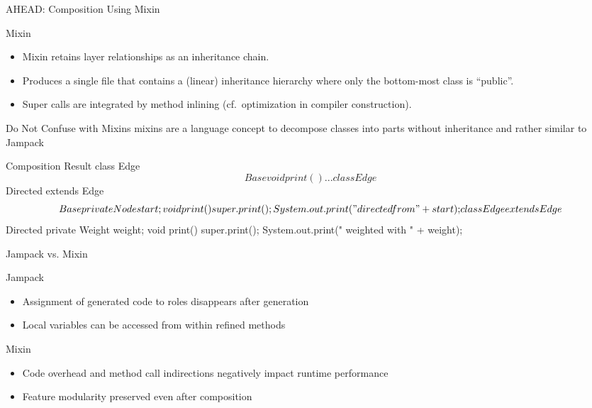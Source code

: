 \begin{frame}[fragile]{AHEAD: Composition Using Mixin}
	\begin{mycolumns}[animation=none]
		\begin{definition}{Mixin}
			\begin{itemize}
				\item Mixin retains layer relationships as an inheritance chain.  
				\item Produces a single file that contains a (linear) inheritance hierarchy where only the bottom-most class is ``public''.
				\item Super calls are integrated by method inlining (cf.\ optimization in compiler construction).
			\end{itemize}
		\end{definition}
		\begin{note}{Do Not Confuse with Mixins} %
			mixins are a language concept to decompose classes into parts without inheritance and rather similar to Jampack
		\end{note}
	\mynextcolumn
{\small
\begin{codetight}{Composition Result}
class Edge$$Base {
	void print() { ... }
}
class Edge$$Directed extends Edge$$Base {
	private Node start;
	void print() {
		super.print();
		System.out.print(" directed from " + start);
	}
}
class Edge extends Edge$$Directed {
	private Weight weight;
	void print() {
		super.print();
		System.out.print(" weighted with " + weight);
	}
}
\end{codetight}
}
	\end{mycolumns}
\end{frame}

\begin{frame}{Jampack vs. Mixin} %
	\begin{mycolumns}
		\begin{note}{Jampack}
			\begin{itemize}
				\item Assignment of generated code to roles disappears after generation 
				\item Local variables can be accessed from within refined methods
			\end{itemize}
		\end{note}
	\mynextcolumn
		\begin{note}{Mixin}
			\begin{itemize}
				\item Code overhead and method call indirections negatively impact runtime performance
				\item Feature modularity preserved even after composition
			\end{itemize}
		\end{note}
	\end{mycolumns}
\end{frame}


